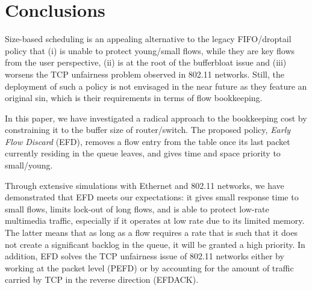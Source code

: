 \documentclass[preprint,12pt]{elsarticle}
\begin{document}
\section{Conclusions}
\label{sec:conclu}

Size-based scheduling is an appealing alternative to the legacy FIFO/drop\-tail policy that (i) is unable to protect young/small flows, while they are key flows from the user perspective, (ii) is at the root of the bufferbloat issue and (iii) worsens the TCP unfairness problem observed in 802.11 networks.  Still, the deployment of such a policy is not envisaged in the near future as they feature an original sin, which is their requirements in terms of flow bookkeeping. 

In this paper, we have investigated a radical approach to the bookkeeping cost by constraining it to the buffer size of router/switch. The proposed policy, \textit{Early Flow Discard} (EFD), removes a flow entry from the table once its last packet currently residing in the queue leaves, and gives time and space priority to small/young.%


Through extensive simulations with Ethernet and 802.11 networks, we have demonstrated that EFD meets our expectations: it gives small response time to small flows, limits lock-out of long flows, and is able to protect low-rate multimedia traffic, especially if it operates at low rate due to its limited memory. The latter means that as long as a flow requires a rate that is such that it does not create a significant backlog in the queue, it will be granted a high priority. In addition, EFD solves the TCP unfairness issue of 802.11 networks either by working at the packet level (PEFD) or by accounting for the amount of traffic carried by TCP in the reverse direction (EFDACK).%
\end{document}

